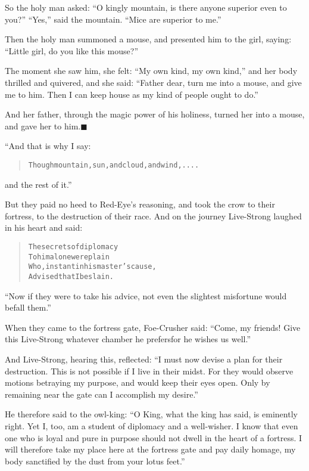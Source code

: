 \documentclass[article, twoside, 14pt]{memoir}
\newcommand{\qed}{\hfill \ensuremath{\blacksquare}}
\renewenvironment{verbatim}{%
\begin{quote}%
\vskip -10pt%
\begin{alltt}\normalfont\large}{\end{alltt}%
\end{quote}%
\vskip -10pt
} %
\begin{document}
So the holy man asked:
``O kingly mountain, is there anyone superior even to you?''
``Yes,'' said the mountain. ``Mice are superior to me.''

Then the holy man summoned a mouse, and presented him to the girl,
saying: ``Little girl, do you like this mouse?''

The moment she saw him, she felt: ``My own kind, my own kind,'' and
her body thrilled and quivered, and she said:
``Father dear, turn me into a mouse, and give me to him. Then I can keep house as my kind of people ought to do.''

And her father, through the magic power of his holiness, turned her
into a mouse, and gave her to him.\hyperref[s60]{\qed}

“And that is why I say:

\begin{verbatim}
Though mountain, sun, and cloud, and wind, ....
\end{verbatim}
and the rest of it.”

But they paid no heed to Red-Eye's reasoning, and took the crow to
their fortress, to the destruction of their race. And on the
journey Live-Strong laughed in his heart and said:

\begin{verbatim}
The secrets of diplomacy
    To him alone were plain
Who, instant in his master's cause,
    Advised that I be slain.
\end{verbatim}
``Now if they were to take his advice, not even the slightest misfortune would befall them.''

When they came to the fortress gate, Foe-Crusher said:
``Come, my friends! Give this Live-Strong whatever chamber he prefers{\textemdash}for he wishes us well.''

And Live-Strong, hearing this, reflected:
``I must now devise a plan for their destruction. This is not possible if I live in their midst. For they would observe motions betraying my purpose, and would keep their eyes open. Only by remaining near the gate can I accomplish my desire.''

He therefore said to the owl-king:
``O King, what the king has said, is eminently right. Yet I, too, am a student of diplomacy and a well-wisher. I know that even one who is loyal and pure in purpose should not dwell in the heart of a fortress. I will therefore take my place here at the fortress gate and pay daily homage, my body sanctified by the dust from your lotus feet.''
\end{document}
